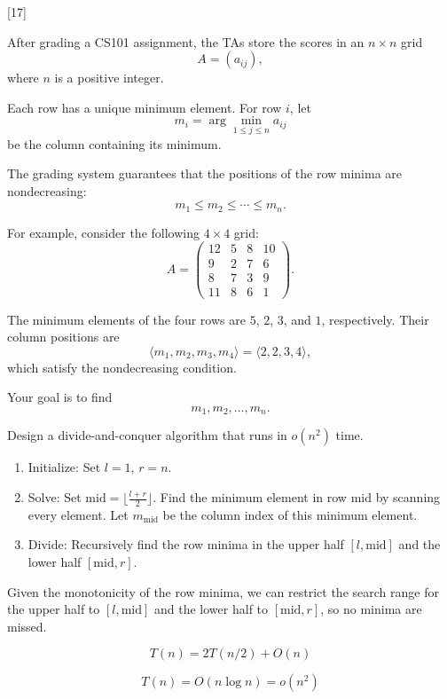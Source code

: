 
[17]

After grading a CS101 assignment, the TAs store the scores in an
$n\times n$ grid
\[
A=(a_{ij}),
\]
where $n$ is a positive integer.

Each row has a unique minimum element. For row $i$, let
\[
m_i=\arg\min_{1\le j\le n} a_{ij}
\]
be the column containing its minimum.

The grading system guarantees that the positions of the row minima are
nondecreasing:
\[
m_1\le m_2\le\cdots\le m_n.
\]

For example, consider the following $4\times4$ grid:
\[
A=
\begin{pmatrix}
12 & 5 & 8 & 10\\
9 & 2 & 7 & 6\\
8 & 7 & 3 & 9\\
11 & 8 & 6 & 1
\end{pmatrix}.
\]

The minimum elements of the four rows are $5$, $2$, $3$, and $1$,
respectively. Their column positions are
\[
\langle m_1,m_2,m_3,m_4\rangle
=
\langle2,2,3,4\rangle,
\]
which satisfy the nondecreasing condition.

Your goal is to find
\[
m_1,m_2,\ldots,m_n.
\]

Design a divide-and-conquer algorithm that runs in $o(n^2)$ time.



\begin{solution}

\begin{enumerate}
    \item[(0)] Initialize: Set $l=1$, $r=n$.
    \item[(1)] Solve: Set $\text{mid}=\lfloor\frac{l+r}{2}\rfloor$. Find the minimum element in row $\text{mid}$ by scanning every element. Let $m_{\text{mid}}$ be the column index of this minimum element.
    \item[(2)] Divide: Recursively find the row minima in the upper half $[l,\text{mid}]$ and the lower half $[\text{mid},r]$.
\end{enumerate}

Given the monotonicity of the row minima, we can restrict the search range for the upper half to $[l,\text{mid}]$ and the lower half to $[\text{mid},r]$, so no minima are missed.

$$
T(n) = 2T(n/2) + O(n)
$$

$$
T(n) = O(n \log n) = o(n^2)
$$

\end{solution}

